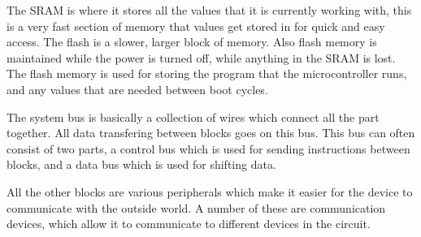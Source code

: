 The SRAM is where it stores all the values that it is currently working with, this is a very fast section of memory that values get stored in for quick and easy access.
The flash is a slower, larger block of memory.
Also flash memory is maintained while the power is turned off, while anything in the SRAM is lost.
The flash memory is used for storing the program that the microcontroller runs, and any values that are needed between boot cycles.

The system bus is basically a collection of wires which connect all the part together.
All data transfering between blocks goes on this bus.
This bus can often consist of two parts, a control bus which is used for sending instructions between blocks, and a data bus which is used for shifting data.

All the other blocks are various peripherals which make it easier for the device to communicate with the outside world.
A number of these are communication devices, which allow it to communicate to different devices in the circuit.
